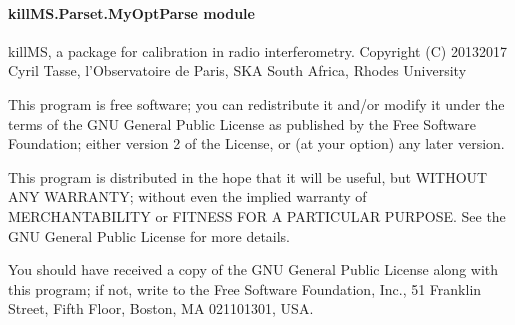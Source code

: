 \documentclass[letterpaper,10pt,english]{sphinxmanual}
\begin{document}
\paragraph{killMS.Parset.MyOptParse module}
\label{\detokenize{api/killMS.Parset:module-killMS.Parset.MyOptParse}}\label{\detokenize{api/killMS.Parset:killms-parset-myoptparse-module}}
\sphinxAtStartPar
killMS, a package for calibration in radio interferometry.
Copyright (C) 2013\sphinxhyphen{}2017  Cyril Tasse, l’Observatoire de Paris,
SKA South Africa, Rhodes University

\sphinxAtStartPar
This program is free software; you can redistribute it and/or
modify it under the terms of the GNU General Public License
as published by the Free Software Foundation; either version 2
of the License, or (at your option) any later version.

\sphinxAtStartPar
This program is distributed in the hope that it will be useful,
but WITHOUT ANY WARRANTY; without even the implied warranty of
MERCHANTABILITY or FITNESS FOR A PARTICULAR PURPOSE.  See the
GNU General Public License for more details.

\sphinxAtStartPar
You should have received a copy of the GNU General Public License
along with this program; if not, write to the Free Software
Foundation, Inc., 51 Franklin Street, Fifth Floor, Boston, MA  02110\sphinxhyphen{}1301, USA.
\end{document}
